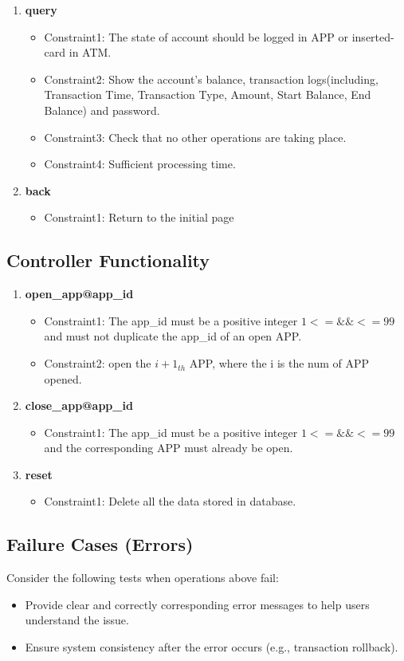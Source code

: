 \documentclass[12pt]{article}
\begin{document}
\begin{enumerate}
    \item \textbf{query}
        \begin{itemize}
            \item Constraint1: The state of account should be logged in APP or inserted-card in ATM.
            \item Constraint2: Show the account's balance, transaction logs(including, Transaction Time, Transaction Type, Amount, Start Balance, End Balance) and password.
            \item Constraint3: Check that no other operations are taking place.
            \item Constraint4: Sufficient processing time.
        \end{itemize}
    \item \textbf{back}
            \begin{itemize}
            \item Constraint1: Return to the initial page
        \end{itemize}
\end{enumerate}

\subsection{Controller Functionality}
\begin{enumerate}
    \item \textbf{open\_app@app\_id}
        \begin{itemize}
            \item Constraint1: The app\_id must be a positive integer $1<=\&\&<=99$ and must not duplicate the app\_id of an open APP.
            \item Constraint2: open the ${i+1}_{th}$ APP, where the i is the num of APP opened. 
        \end{itemize}
    \item \textbf{close\_app@app\_id}
        \begin{itemize}
            \item Constraint1: The app\_id must be a positive integer $1<=\&\&<=99$ and the corresponding APP must already be open.
        \end{itemize}
    \item \textbf{reset}
        \begin{itemize}
            \item Constraint1: Delete all the data stored in database.
        \end{itemize}
\end{enumerate}

\subsection{Failure Cases (Errors)}

Consider the following tests when operations above fail:
\begin{itemize}
    \item Provide clear and correctly corresponding error messages to help users understand the issue.
    \item Ensure system consistency after the error occurs (e.g., transaction rollback).
\end{itemize}
\end{document}
